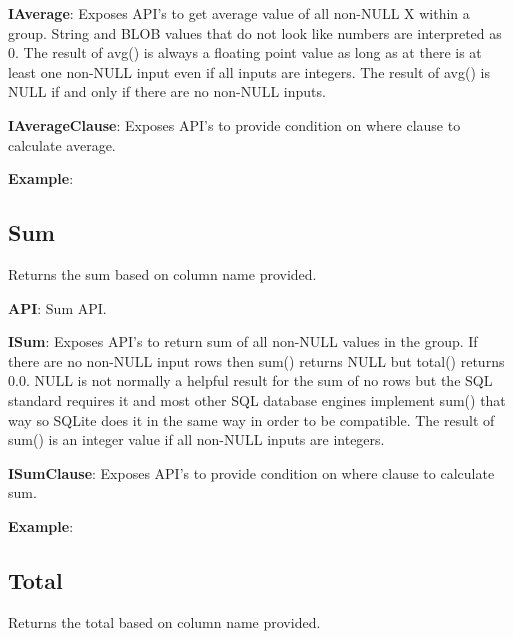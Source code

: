 			\textbf{IAverage}:  Exposes API's to get average value of all non-NULL X within a group. 
 						 String and BLOB values that do not look like numbers are interpreted as 0.
						 The result of avg() is always a floating point value as long as at there is at least one non-NULL input even if all inputs are integers.
						 The result of avg() is NULL if and only if there are no non-NULL inputs.

				

			
			\textbf{IAverageClause}: Exposes API's to provide condition on where clause to calculate average.
				

			\textbf{Example}: 
				
		

	\subsection{Sum} 
		\par 
		Returns the sum based on column name provided.

			\textbf{API}: Sum API.
				
		
			\textbf{ISum}:   Exposes API's to return sum of all non-NULL values in the group.
					  	 If there are no non-NULL input rows then sum() returns NULL but total() returns 0.0.
						 NULL is not normally a helpful result for the sum of no rows but the SQL standard requires it and most other SQL database engines implement sum() that way so SQLite does it in the same way in order to be compatible.
						 The result of sum() is an integer value if all non-NULL inputs are integers. 

				

			
			\textbf{ISumClause}: Exposes API's to provide condition on where clause to calculate sum.
				

			\textbf{Example}: 
				


	\subsection{Total} 
		\par 
		Returns the total based on column name provided.


